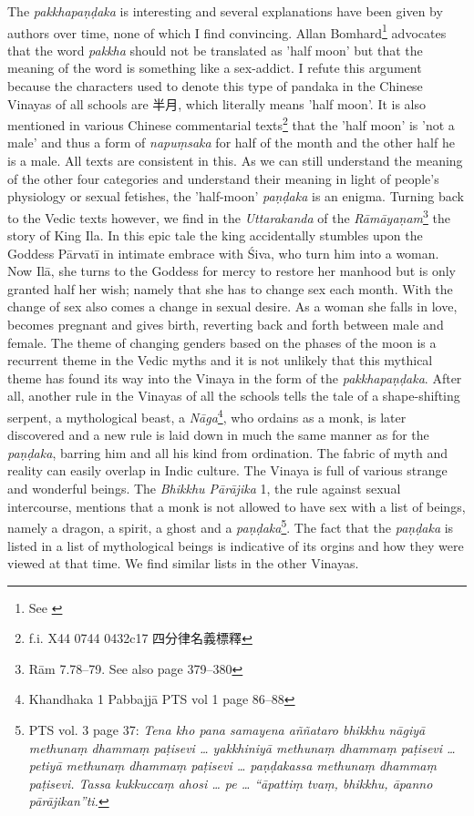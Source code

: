 The {\em pakkhapaṇḍaka} is interesting and several explanations have been given by authors over time, none of which I find convincing. Allan Bomhard\footnote{See \cite{bomhard}} advocates that the word {\em pakkha} should not be translated as 'half moon' but that the meaning of the word is something like a sex-addict. I refute this argument because the characters used to denote this type of pandaka in the Chinese Vinayas of all schools are 半月, which literally means 'half moon'. It is also mentioned in various Chinese commentarial texts\footnote{f.i. X44 0744 0432c17 四分律名義標釋} that the 'half moon' is 'not a male' and thus a form of {\em napuṃsaka} for half of the month and the other half he is a male. All texts are consistent in this. As we can still understand the meaning of the other four categories and understand their meaning in light of people's physiology or sexual fetishes, the 'half-moon' {\em paṇḍaka} is an enigma. Turning back to the Vedic texts however, we find in the {\em Uttarakanda} of the {\em Rāmāyaṇam}\footnote{Rām 7.78–79. See also \cite{goldman} page 379–380} the story of King Ila. In this epic tale the king accidentally stumbles upon the Goddess Pārvatī in intimate embrace with Śiva, who turn him into a woman. Now Ilā, she turns to the Goddess for mercy to restore her manhood but is only granted half her wish; namely that she has to change sex each month. With the change of sex also comes a change in sexual desire. As a woman she falls in love, becomes pregnant and gives birth, reverting back and forth between male and female. The theme of changing genders based on the phases of the moon is a recurrent theme in the Vedic myths and it is not unlikely that this mythical theme has found its way into the Vinaya in the form of the {\em pakkhapaṇḍaka}. After all, another rule in the Vinayas of all the schools tells the tale of a shape-shifting serpent, a mythological beast, a {\em Nāga}\footnote{Khandhaka 1 Pabbajjā PTS vol 1 page 86–88}, who ordains as a monk, is later discovered and a new rule is laid down in much the same manner as for the {\em paṇḍaka}, barring him and all his kind from ordination. The fabric of myth and reality can easily overlap in Indic culture. The Vinaya is full of various strange and wonderful beings. The ­{\em Bhikkhu Pā­rāji­ka} 1, the rule against sexual intercourse, mentions that a monk is not allowed to have sex with a list of beings, namely a dragon, a spirit, a ghost and a {\em paṇḍaka}\footnote{PTS vol. 3 page 37: {\em Tena kho pana samayena aññataro bhikkhu nāgiyā methunaṃ dhammaṃ paṭisevi … yakkhiniyā methunaṃ dhammaṃ paṭisevi … petiyā methunaṃ dhammaṃ paṭisevi … paṇḍakassa methunaṃ dhammaṃ paṭisevi. Tassa kukkuccaṃ ahosi … pe … “āpattiṃ tvaṃ, bhikkhu, āpanno pārājikan”ti.}}. The fact that the {\em paṇḍaka} is listed in a list of mythological beings is indicative of its orgins and how they were viewed at that time. We find similar lists in the other Vinayas.


